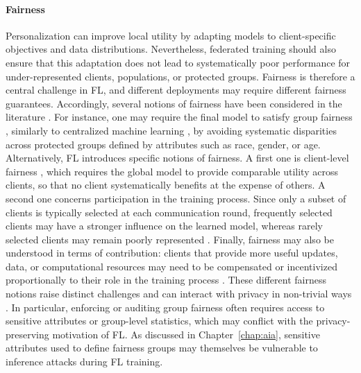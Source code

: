 \paragraph{Fairness}
Personalization can improve local utility by adapting models to client-specific objectives and data distributions. Nevertheless, federated training should also ensure that this adaptation does not lead to systematically poor performance for under-represented clients, populations, or protected groups.
Fairness is therefore a central challenge in FL, and different deployments may require different fairness guarantees. Accordingly, several notions of fairness have been considered in the literature \cite{Vucinich_fairness,Shi_fairness, salazar_fairness}. For instance, one may require the final model to satisfy group fairness \cite{salazar_fairness}, similarly to centralized machine learning \cite{dwork_fairness, zemel2013learning_fairness}, by avoiding systematic disparities across protected groups defined by attributes such as race, gender, or age. Alternatively, FL introduces specific notions of fairness. A first one is client-level fairness \cite{li2020fairresourceallocationfederated, erraji2026lossgapparityfairness}, which requires the global model to provide comparable utility across clients, so that no client systematically benefits at the expense of others. A second one concerns participation in the training process. Since only a subset of clients is typically selected at each communication round, frequently selected clients may have a stronger influence on the learned model, whereas rarely selected clients may remain poorly represented \cite{huang_fairness, fairness_shi_client_selection}. Finally, fairness may also be understood in terms of contribution: clients that provide more useful updates, data, or computational resources may need to be compensated or incentivized proportionally to their role in the training process \cite{shi_fairness_incentives, Chen_fairness_incentives}. These different fairness notions raise distinct challenges and can interact with privacy in non-trivial ways \cite{chen_privacy_fairness, fairness_fl_rafi}. In particular, enforcing or auditing group fairness often requires access to sensitive attributes or group-level statistics, which may conflict with the privacy-preserving motivation of FL. As discussed in Chapter~\ref{chap:aia}, sensitive attributes used to define fairness groups may themselves be vulnerable to inference attacks during FL training.

